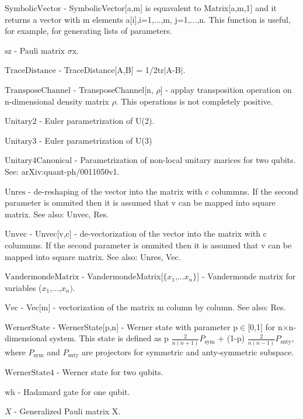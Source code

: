 \documentclass[a4paper,12pt]{article}
\begin{document}
\textbf{$ \text{SymbolicVector} $ } - SymbolicVector[a,m] is equavalent to Matrix[a,m,1] and it returns a vector with m elements a[i],i=1,...,m, j=1,...,n. This function is useful, for example, for generating lists of parameters.$  $

\textbf{$ \text{sz} $ } - Pauli matrix $\sigma $x.$  $

\textbf{$ \text{TraceDistance} $ } - TraceDistance[A,B] = 1/2tr$|$A-B$|$.$  $

\textbf{$ \text{TransposeChannel} $ } - TransposeChannel[n, $\rho $] - applay transposition operation on n-dimensional density matrix $\rho $. This operations is not completely positive.$  $

\textbf{$ \text{Unitary2} $ } - Euler parametrization of U(2).$  $

\textbf{$ \text{Unitary3} $ } - Euler parametrization of U(3)$  $

\textbf{$ \text{Unitary4Canonical} $ } - Parametrization of non-local unitary marices for two qubits. See: arXiv:quant-ph/0011050v1.$  $

\textbf{$ \text{Unres} $ } - de-reshaping of the vector into the matrix with c colummns. If the second parameter is ommited then it is assumed that v can be mapped into square matrix. See also: Unvec, Res.$  $

\textbf{$ \text{Unvec} $ } - Unvec[v,c] - de-vectorization of the vector into the matrix with c colummns. If the second parameter is ommited then it is assumed that v can be mapped into square matrix. See also: Unres, Vec.$  $

\textbf{$ \text{VandermondeMatrix} $ } - VandermondeMatrix[$\{$$ x_1\text{,...}x_n $$\}$] - Vandermonde matrix for variables ($ x_1 $,...,$ x_n\text{).} $

\textbf{$ \text{Vec} $ } - Vec[m] - vectorization of the matrix m column by column. See also: Res.$  $

\textbf{$ \text{WernerState} $ } - WernerState[p,n] - Werner state with parameter p$\in $[0,1] for n$\times $n-dimensional system. This state is defined as p $ \frac{2}{n(n+1)}P_{\text{sym}} $ + (1-p) $ \frac{2}{n(n-1)}P_{\text{snty}} $, where $ P_{\text{sym}} $ and $ P_{\text{snty}} $ are projectors for symmetric and anty-symmetric subspace.$  $

\textbf{$ \text{WernerState4} $ } - Werner state for two qubits.$  $

\textbf{$ \text{wh} $ } - Hadamard gate for one qubit.$  $

\textbf{$ X $ } - Generalized Pauli matrix X.$  $
\end{document}
